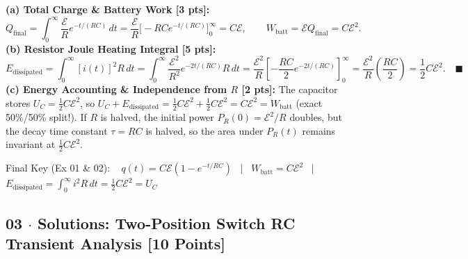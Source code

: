 \documentclass[10pt,letterpaper]{article}
\begin{document}
  \textbf{(a) Total Charge \& Battery Work [3 pts]:}
  $$Q_{\text{final}} = \int_{0}^{\infty} \frac{\mathcal{E}}{R}e^{-t/(RC)}\,dt = \frac{\mathcal{E}}{R}\Big[-RC e^{-t/(RC)}\Big]_{0}^{\infty} = C\mathcal{E}, \qquad W_{\text{batt}} = \mathcal{E} Q_{\text{final}} = C\mathcal{E}^2.$$
  \textbf{(b) Resistor Joule Heating Integral [5 pts]:}
  $$E_{\text{dissipated}} = \int_{0}^{\infty} [i(t)]^2 R\,dt = \int_{0}^{\infty} \frac{\mathcal{E}^2}{R^2} e^{-2t/(RC)} R\,dt = \frac{\mathcal{E}^2}{R} \left[-\frac{RC}{2} e^{-2t/(RC)}\right]_{0}^{\infty} = \frac{\mathcal{E}^2}{R}\left(\frac{RC}{2}\right) = \frac{1}{2}C\mathcal{E}^2. \quad \blacksquare$$
  \textbf{(c) Energy Accounting \& Independence from $R$ [2 pts]:} The capacitor stores $U_C = \frac{1}{2}C\mathcal{E}^2$, so $U_C + E_{\text{dissipated}} = \frac{1}{2}C\mathcal{E}^2 + \frac{1}{2}C\mathcal{E}^2 = C\mathcal{E}^2 = W_{\text{batt}}$ (exact 50\%/50\% split!). If $R$ is halved, the initial power $P_R(0) = \mathcal{E}^2/R$ doubles, but the decay time constant $\tau = RC$ is halved, so the area under $P_R(t)$ remains invariant at $\frac{1}{2}C\mathcal{E}^2$.

Final Key (Ex 01 \& 02): ~ $q(t) = C\mathcal{E}(1 - e^{-t/RC})$ ~|~ $W_{\text{batt}} = C\mathcal{E}^2$ ~|~ $E_{\text{dissipated}} = \int_0^\infty i^2 R\,dt = \frac{1}{2}C\mathcal{E}^2 = U_C$


\newpage



\subsection*{03 $\cdot$ Solutions: Two-Position Switch RC Transient Analysis \hfill [10 Points]}
\end{document}
